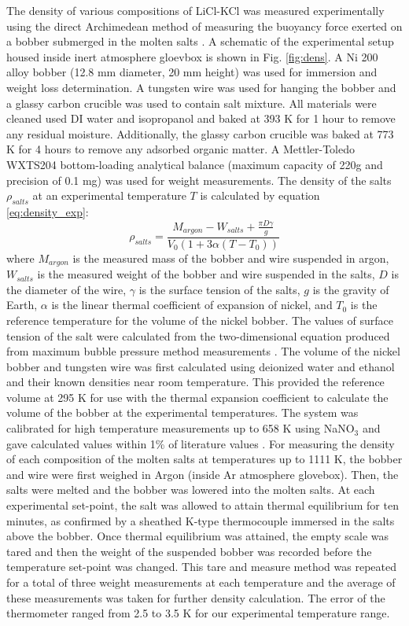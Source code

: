 \documentclass[review]{elsarticle}
\begin{document}
The density of various compositions of LiCl-KCl was measured experimentally using the direct Archimedean method of measuring the buoyancy force exerted on a bobber submerged in the molten salts \cite{Sato2009}. A schematic of the experimental setup housed inside inert atmosphere gloevbox is shown in Fig. \ref{fig:dens}. A Ni 200 alloy bobber (12.8 mm diameter, 20 mm height) was used for immersion and weight loss determination. A tungsten wire was used for hanging the bobber and a glassy carbon crucible was used to contain salt mixture. All materials were cleaned used DI water and isopropanol and baked at 393 K for 1 hour to remove any residual moisture. Additionally, the glassy carbon crucible was baked at 773 K for 4 hours to remove any adsorbed organic matter. A Mettler-Toledo WXTS204 bottom-loading analytical balance (maximum capacity of 220g and precision of 0.1 mg) was used for weight measurements. The density of the salts $\rho_{salts}$ at an experimental temperature $T$ is calculated by equation \ref{eq:density_exp}:
\begin{equation}
    \label{eq:density_exp}
    \rho_{salts} = \frac{M_{argon} - W_{salts} + \frac{ \pi D\gamma}{g} }{V_0 (1 + 3\alpha(T - T_0))}
\end{equation}
where $M_{argon}$ is the measured mass of the bobber and wire suspended in argon, $W_{salts}$ is the measured weight of the bobber and wire suspended in the salts, $D$ is the diameter of the wire, $\gamma$ is the surface tension of the salts, $g$ is the gravity of Earth, $\alpha$ is the linear thermal coefficient of expansion of nickel, and $T_0$ is the reference temperature for the volume of the nickel bobber. The values of surface tension of the salt were calculated from the two-dimensional equation produced from maximum bubble pressure method measurements \cite{janz1975molten}. The volume of the nickel bobber and tungsten wire was first calculated using deionized water and ethanol and their known densities near room temperature. This provided the reference volume at 295 K for use with the thermal expansion coefficient to calculate the volume of the bobber at the experimental temperatures. The system was calibrated for high temperature measurements up to 658 K using NaNO$_{3}$ and gave calculated values within 1\% of literature values \cite{Janz1972}. For measuring the density of each composition of the molten salts at temperatures up to 1111 K, the bobber and wire were first weighed in Argon (inside Ar atmosphere glovebox). Then, the salts were melted and the bobber was lowered into the molten salts. At each experimental set-point, the salt was allowed to attain thermal equilibrium for ten minutes, as confirmed by a sheathed K-type thermocouple immersed in the salts above the bobber. Once thermal equilibrium was attained, the empty scale was tared and then the weight of the suspended bobber was recorded before the temperature set-point was changed. This tare and measure method was repeated for a total of three weight measurements at each temperature and the average of these measurements was taken for further density calculation. The error of the thermometer ranged from 2.5 to 3.5 K for our experimental temperature range.
\end{document}
